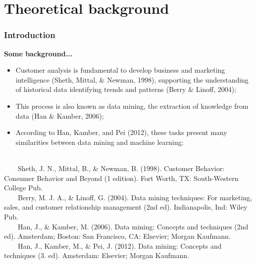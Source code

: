 \documentclass[10pt]{beamer}
\begin{document}
\section{Theoretical background}
\begin{frame}
	\frametitle{Introduction}
	\Large
	\textbf{Some background...}\\
		\begin{itemize} \normalsize
			\item Customer analysis is fundamental to develop business and marketing intelligence \footnotesize(Sheth, Mittal, \& Newman, 1998)\normalsize, supporting the understanding of historical data identifying trends and patterns \footnotesize(Berry \& Linoff, 2004)\normalsize;
			\item This process is also known as data mining, the extraction of knowledge from data \footnotesize(Han \& Kamber, 2006)\normalsize;
			\item According to \footnotesize Han, Kamber, and Pei (2012)\normalsize, these tasks present many similarities between data mining and machine learning; \\~\\
		\end{itemize}	
	\tiny
	~~~~Sheth, J. N., Mittal, B., \& Newman, B. (1998). Customer Behavior: Consumer Behavior and Beyond (1 edition). Fort Worth, TX: South-Western College Pub. \\
	~~~~Berry, M. J. A., \& Linoff, G. (2004). Data mining techniques: For marketing, sales, and customer relationship management (2nd ed). Indianapolis, Ind: Wiley Pub.\\
	~~~~Han, J., \& Kamber, M. (2006). Data mining: Concepts and techniques (2nd ed). Amsterdam; Boston: San Francisco, CA: Elsevier; Morgan Kaufmann.\\
	~~~~Han, J., Kamber, M., \& Pei, J. (2012). Data mining: Concepts and techniques (3. ed). Amsterdam: Elsevier; Morgan Kaufmann.\\
\end{frame}
\end{document}

